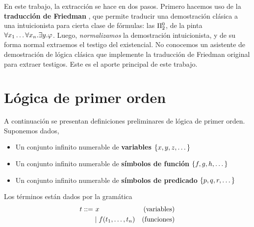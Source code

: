 En este trabajo, la extracción se hace en dos pasos. Primero hacemos uso de la \textbf{traducción de Friedman} \cite{miquel-friedman}, que permite traducir una demostración clásica a una intuicionista para cierta clase de fórmulas: las $\Pi^0_{2}$, de la pinta $\forall x_1 \dots \forall x_n . \exists y . \varphi$. Luego, \textit{normalizamos} la demostración intuicionista, y de su forma normal extraemos el testigo del existencial. No conocemos un asistente de demostración de lógica clásica que implemente la traducción de Friedman original para extraer testigos. Este es el aporte principal de este trabajo.

\section{Lógica de primer orden}

A continuación se presentan definiciones preliminares de lógica de primer orden. Suponemos dados,

\begin{itemize}
    \item Un conjunto infinito numerable de \textbf{variables}
    \(
        \{x, y, z, \dots\}
    \)
    \item Un conjunto infinito numerable de \textbf{símbolos de función}
    \(
        \{f, g, h, \dots\}
    \)
    \item Un conjunto infinito numerable de \textbf{símbolos de predicado}
    \(
        \{p, q, r, \dots\}
    \)
\end{itemize}

\begin{definition}[Términos]
    Los términos están dados por la gramática
    \begin{align*}
        \term ::= &\ \var                               &\text{(variables)} \\
                  & \mid \fun(\term_1, \dots, \term_n) &\text{(funciones)}
    \end{align*}
\end{definition}

